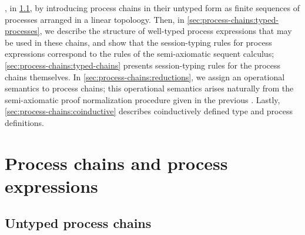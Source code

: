 , in \cref{sec:process-chains:untyped-chains}, by introducing process chains in their untyped form as finite sequences of processes arranged in a linear topoloogy.
Then, in \cref{sec:process-chains:typed-processes}, we describe the structure of well-typed process expressions that may be used in these chains, and show that the session-typing rules for process expressions correspond to the rules of the semi-axiomatic sequent calculus;
\cref{sec:process-chains:typed-chains} presents session-typing rules for the process chains themselves.
In \cref{sec:process-chains:reductions}, we assign an operational semantics to process chains; this operational semantics arises naturally from the semi-axiomatic proof normalization procedure given in the previous .
Lastly, \cref{sec:process-chains:coinductive} describes coinductively defined type and process definitions.


\section{Process chains and process expressions}\label{sec:process-chains:interpretation}

\subsection{Untyped process chains}\label{sec:process-chains:untyped-chains}

